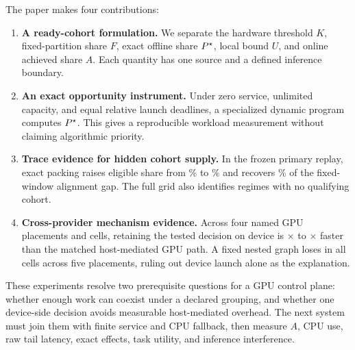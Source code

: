 The paper makes four contributions:

\begin{enumerate}[label=\arabic*.]
  \item \textbf{A ready-cohort formulation.} We separate the hardware
  threshold $K$, fixed-partition share $F$, exact offline share $P^\star$, local
  bound $U$, and online achieved share $A$. Each quantity has one source and a
  defined inference boundary.
  \item \textbf{An exact opportunity instrument.} Under zero service,
  unlimited capacity, and equal relative launch deadlines, a specialized
  dynamic program computes $P^\star$. This gives a reproducible workload
  measurement without claiming algorithmic priority.
  \item \textbf{Trace evidence for hidden cohort supply.} In the frozen
  primary replay, exact packing raises eligible share from
  \TraceFixedPct\% to \TraceExactPct\% and recovers
  \TraceGapClosurePct\% of the fixed-window alignment gap. The full grid also
  identifies regimes with no qualifying cohort.
  \item \textbf{Cross-provider mechanism evidence.} Across four named GPU
  placements and \ResidentCells{} cells, retaining the tested decision on
  device is \ResidentRatioMin$\times$ to \ResidentRatioMax$\times$ faster
  than the matched host-mediated GPU path. A fixed nested graph loses in all
  \NativeCells{} cells across five placements, ruling out device launch alone
  as the explanation.
\end{enumerate}

These experiments resolve two prerequisite questions for a GPU control plane:
whether enough work can coexist under a declared grouping, and whether one
device-side decision avoids measurable host-mediated overhead. The next system
must join them with finite service and CPU fallback, then measure $A$, CPU use,
raw tail latency, exact effects, task utility, and inference interference.

